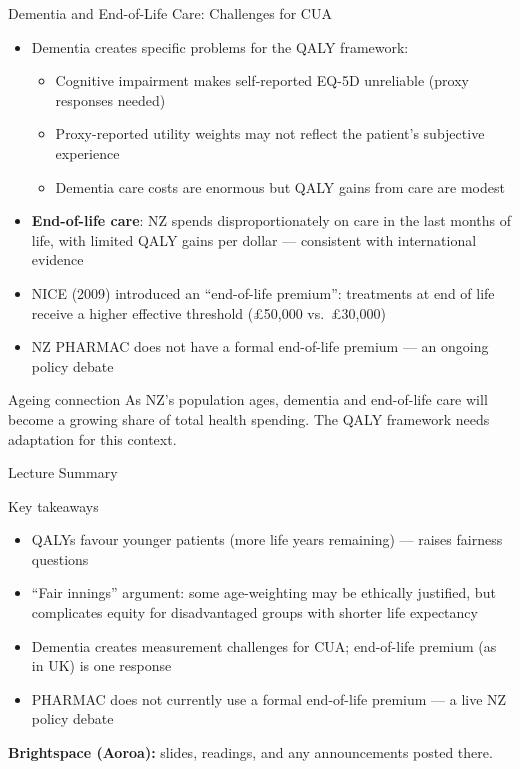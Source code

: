 \documentclass[aspectratio=169, 12pt]{beamer}
\newcommand{\summaryside}[1]{%
  \begin{frame}{Lecture Summary}
    \begin{exampleblock}{Key takeaways}
      \begin{itemize}#1\end{itemize}
    \end{exampleblock}
    \vspace{0.5em}
    {\footnotesize\textcolor{OtagoGold}{\textbf{Brightspace (Aoroa):}} slides, readings, and any announcements posted there.}
  \end{frame}}
\begin{document}
\begin{frame}{Dementia and End-of-Life Care: Challenges for CUA}
  \begin{itemize}
    \item Dementia creates specific problems for the QALY framework:
    \begin{itemize}
      \item Cognitive impairment makes self-reported EQ-5D unreliable (proxy responses needed)
      \item Proxy-reported utility weights may not reflect the patient's subjective experience
      \item Dementia care costs are enormous but QALY gains from care are modest
    \end{itemize}
    \item \textbf{End-of-life care}: NZ spends disproportionately on care in the last months
          of life, with limited QALY gains per dollar --- consistent with international evidence
    \item NICE (2009) introduced an ``end-of-life premium'': treatments at end of life
          receive a higher effective threshold (£50,000 vs.\ £30,000)
    \item NZ PHARMAC does not have a formal end-of-life premium --- an ongoing policy debate
  \end{itemize}
  \begin{block}{Ageing connection}
    As NZ's population ages, dementia and end-of-life care will become a growing share of total
    health spending. The QALY framework needs adaptation for this context.
  \end{block}
\end{frame}

\summaryside{
  \item QALYs favour younger patients (more life years remaining) --- raises fairness questions
  \item ``Fair innings'' argument: some age-weighting may be ethically justified, but complicates equity for disadvantaged groups with shorter life expectancy
  \item Dementia creates measurement challenges for CUA; end-of-life premium (as in UK) is one response
  \item PHARMAC does not currently use a formal end-of-life premium --- a live NZ policy debate
}


\end{document}
